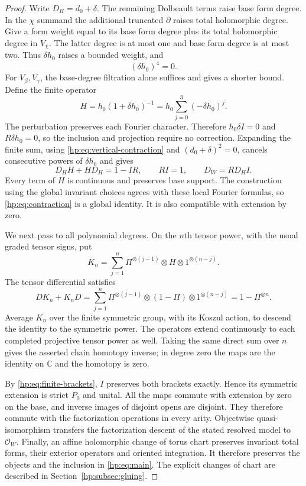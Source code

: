 \begin{proof}
Write $D_H=d_0+\delta$. The remaining Dolbeault terms raise base
form degree. In the $\chi$ summand the additional truncated
$\partial$ raises total holomorphic degree. Give a form weight
equal to its base form degree plus its total holomorphic degree
in $V_\chi$. The latter degree is at most one and base form
degree is at most two. Thus $\delta h_0$ raises a bounded weight,
and
\[
 (\delta h_0)^4=0.
\]
For $V_\beta,V_\gamma$, the base-degree filtration alone suffices
and gives a shorter bound. Define the finite operator
\begin{equation}\label{hp:eq:homotopy}
 H=h_0(1+\delta h_0)^{-1}
   =h_0\sum_{j=0}^{3}(-\delta h_0)^j.
\end{equation}
The perturbation preserves each Fourier character. Therefore
$h_0\delta I=0$ and $R\delta h_0=0$, so the inclusion and
projection require no correction. Expanding the finite sum,
using \eqref{hp:eq:vertical-contraction} and
$(d_0+\delta)^2=0$, cancels consecutive powers of $\delta h_0$
and gives
\begin{equation}\label{hp:eq:contraction}
 D_HH+HD_H=1-IR,
 \qquad RI=1,
 \qquad D_W=RD_HI.
\end{equation}
Every term of $H$ is continuous and preserves base support.
The construction using the global invariant choices agrees with
these local Fourier formulas, so \eqref{hp:eq:contraction} is a
global identity. It is also compatible with extension by zero.

We next pass to all polynomial degrees. On the $n$th tensor power,
with the usual graded tensor signs, put
\[
 K_n=\sum_{j=1}^{n}\Pi^{\otimes(j-1)}\otimes H
                         \otimes1^{\otimes(n-j)}.
\]
The tensor differential satisfies
\[
 D K_n+K_nD
 =\sum_{j=1}^{n}\Pi^{\otimes(j-1)}\otimes(1-\Pi)
                         \otimes1^{\otimes(n-j)}
 =1-\Pi^{\otimes n}.
\]
Average $K_n$ over the finite symmetric group, with its Koszul
action, to descend the identity to the symmetric power. The
operators extend continuously to each completed projective
tensor power as well. Taking the same direct sum over $n$ gives
the asserted chain homotopy inverse; in degree zero the maps
are the identity on $\mathbb C$ and the homotopy is zero.

By \eqref{hp:eq:finite-brackets}, $I$ preserves both brackets
exactly. Hence its symmetric extension is strict $P_0$ and unital.
All the maps commute with extension by zero on the base, and
inverse images of disjoint opens are disjoint. They therefore
commute with the factorization operations in every arity.
Objectwise quasi-isomorphism transfers the factorization descent
of the stated resolved model to $\mathcal O_W$. Finally, an affine
holomorphic change of torus chart preserves invariant total
forms, their exterior operators and oriented integration. It
therefore preserves the objects and the inclusion in
\eqref{hp:eq:main}. The explicit changes of chart are described
in Section~\ref{hp:subsec:gluing}.
\end{proof}

